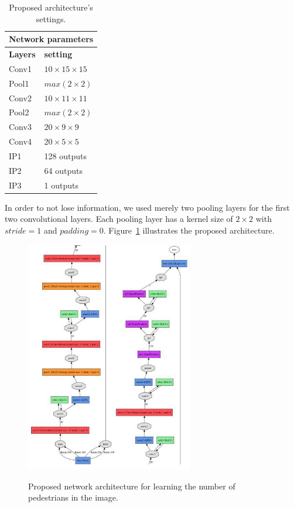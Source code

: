\begin{table}[H]
	\centering
	\begin{tabular}{ |p{2cm}|p{2cm}| }
	\hline 
	\multicolumn{2}{|c|}{\textbf{Network parameters}} \\
	\hline
	\hline
	\textbf{Layers} & \textbf{setting }\\
	\hline
	Conv1 & $10\times15\times15$\\
	\hline
	Pool1 & $max(2\times2)$ \\
	\hline
	Conv2 & $10\times11\times11$\\
	\hline
	Pool2 & $max(2\times2)$ \\
	\hline
	Conv3 & $20\times9\times9$\\
	\hline
	Conv4 & $20\times5\times5$\\
	\hline
	IP1   & 128 outputs \\
	\hline
	IP2   & 64 outputs \\
	\hline
	IP3   & 1 outputs \\
	\hline
	\end{tabular}
		\caption{Proposed architecture's settings.}
		\label{ourpednet}
\end{table}

\indent In order to not lose information, we used merely two pooling layers for the first two convolutional layers. Each pooling layer has a kernel size of $2\times2$ with $stride = 1$  and $padding = 0$. Figure~\ref{fig:ucsdnet} illustrates the proposed architecture. 

\begin{figure}[H]
  \centering
   {\includegraphics[width=0.65\textwidth]{images/uscdmine}}
	\caption{Proposed network architecture for learning the number of pedestrians in the image.}
	\label{fig:ucsdnet}
\end{figure}

